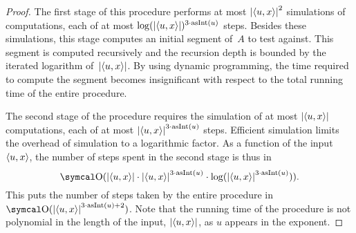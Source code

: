 \begin{proof}
  The first stage of this procedure performs at most ${\lvert{\langle u, x\rangle}\rvert}^2$ simulations of computations, each of at most $\log({\lvert{\langle u, x\rangle}\rvert})^{3 \cdot \operatorname{asInt}(u)}$ steps.
  Besides these simulations, this stage computes an initial segment of~$A$ to test against.
  This segment is computed recursively and the recursion depth is bounded by the iterated logarithm of~${\lvert{\langle u, x\rangle}\rvert}$.
  By using dynamic programming, the time required to compute the segment becomes insignificant with respect to the total running time of the entire procedure.

  The second stage of the procedure requires the simulation of at most ${\lvert{\langle u, x\rangle}\rvert}$ computations, each of at most ${\lvert{\langle u, x\rangle}\rvert}^{3 \cdot \operatorname{asInt}(u)}$ steps.
  Efficient simulation \parencite{arora2009computational} limits the overhead of simulation to a logarithmic factor.
  As a function of the input~${\langle u, x\rangle}$, the number of steps spent in the second stage is thus in
  \begin{equation*}
    \bigO(\length{\pair{u}{x}} \cdot \length{\pair{u}{x}}^{3 \cdot \asNat(u)} \cdot \log(\length{\pair{u}{x}}^{3 \cdot \asNat(u)})).
  \end{equation*}
  This puts the number of steps taken by the entire procedure in $\bigO(\length{\pair{u}{x}}^{3 \cdot \asNat(u) + 2})$.
  Note that the running time of the procedure is not polynomial in the length of the input, ${\lvert{\langle u, x\rangle}\rvert}$, as $u$ appears in the exponent.


\end{proof}
